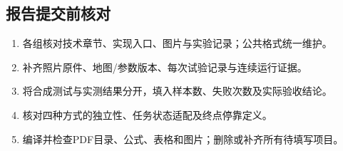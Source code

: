 \subsection{报告提交前核对}
\begin{enumerate}
\item 各组核对技术章节、实现入口、图片与实验记录；公共格式统一维护。
\item 补齐照片原件、地图/参数版本、每次试验记录与连续运行证据。
\item 将合成测试与实测结果分开，填入样本数、失败次数及实际验收结论。
\item 核对四种方式的独立性、任务状态适配及终点停靠定义。
\item 编译并检查PDF目录、公式、表格和图片；删除或补齐所有待填写项目。
\end{enumerate}
